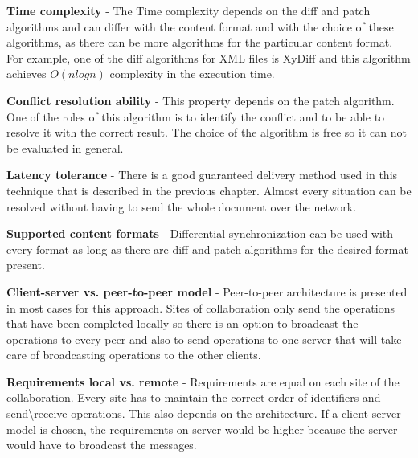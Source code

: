 \documentclass[12pt,oneside]{fithesis2}
\begin{document}
\vspace{3mm}

\textbf{Time complexity} - The Time complexity depends on the diff and patch algorithms and can differ with the content format and with the choice of these algorithms, as there can be more algorithms for the particular content format. For example, one of the diff algorithms for XML files is XyDiff\cite{Xdiff} and this algorithm achieves \(O(nlogn)\) complexity in the execution time.

\vspace{3mm}

\textbf{Conflict resolution ability} - This property depends on the patch algorithm. One of the roles of this algorithm is to identify the conflict and to be able to resolve it with the correct result. The choice of the algorithm is free so it can not be evaluated in general.

\vspace{3mm}

\textbf{Latency tolerance} - There is a good guaranteed delivery method used in this technique that is described in the previous chapter. Almost every situation can be resolved without having to send the whole document over the network.

\vspace{3mm}

\textbf{Supported content formats} - Differential synchronization can be used with every format as long as there are diff and patch algorithms for the desired format present.

\vspace{3mm} 

\par \textbf{\underline{}}

\vspace{3mm} 

\textbf{Client-server vs. peer-to-peer model} - Peer-to-peer architecture is presented in most cases for this approach. Sites of collaboration only send the operations that have been completed locally so there is an option to broadcast the operations to every peer and also to send operations to one server that will take care of broadcasting operations to the other clients.

\vspace{3mm} 

\textbf{Requirements local vs. remote} - Requirements are equal on each site of the collaboration. Every site has to maintain the correct order of identifiers and send\textbackslash receive operations. This also depends on the architecture. If a client-server model is chosen, the requirements on server would be higher because the server would have to broadcast the messages.
\end{document}
